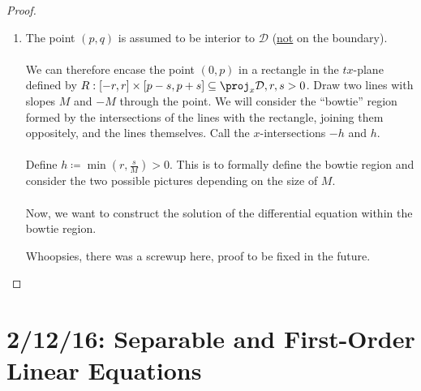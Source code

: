\documentclass[12pt]{article}
\begin{document}
\begin{proof}
\begin{enumerate}
\item The point $(p,q)$ is assumed to be interior to $\mathcal{D}$ (\underline{not} on the boundary). \\ \\
We can therefore encase the point $(0,p)$ in a rectangle in the $tx$-plane defined by $R:[-r,r] \times [p-s,p+s] \subseteq \proj_{x}\mathcal{D}, r,s > 0$. Draw two lines with slopes $M$ and $-M$ through the point. We will consider the ``bowtie'' region formed by the intersections of the lines with the rectangle, joining them oppositely, and the lines themselves. Call the $x$-intersections $-h$ and $h$. \\ \\
Define $h \coloneqq \min\left(r,\frac{s}{M}\right) > 0$. This is to formally define the bowtie region and consider the two possible pictures depending on the size of $M$. \\ \\
Now, we want to construct the solution of the differential equation within the bowtie region. 

Whoopsies, there was a screwup here, proof to be fixed in the future.
\begin{figure}[h!]
  \centering
\end{figure}

\end{enumerate}

\end{proof}

\section{2/12/16: Separable and First-Order Linear Equations}
\end{document}
